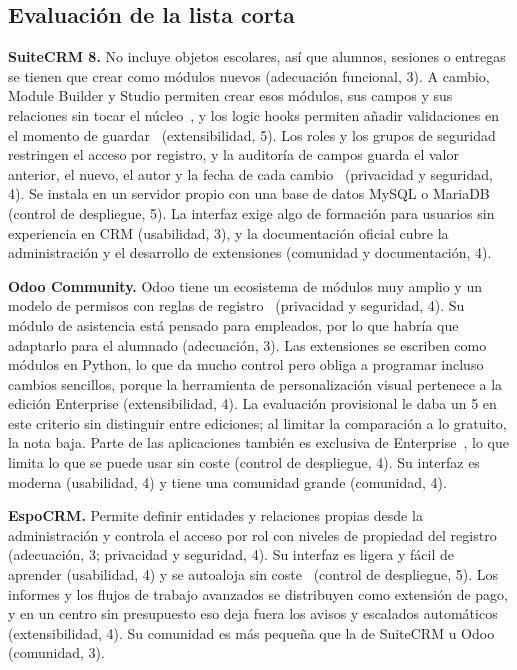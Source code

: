 \subsection{Evaluación de la lista corta}\label{sec:dis-evaluacion}

\textbf{SuiteCRM 8.} No incluye objetos escolares, así que alumnos, sesiones o entregas se tienen que crear como módulos nuevos (adecuación funcional, 3). A cambio, Module Builder y Studio permiten crear esos módulos, sus campos y sus relaciones sin tocar el núcleo~\cite{ref07}, y los logic hooks permiten añadir validaciones en el momento de guardar~\cite{ref50} (extensibilidad, 5). Los roles y los grupos de seguridad restringen el acceso por registro, y la auditoría de campos guarda el valor anterior, el nuevo, el autor y la fecha de cada cambio~\cite{ref08} (privacidad y seguridad, 4). Se instala en un servidor propio con una base de datos MySQL o MariaDB (control de despliegue, 5). La interfaz exige algo de formación para usuarios sin experiencia en CRM (usabilidad, 3), y la documentación oficial cubre la administración y el desarrollo de extensiones (comunidad y documentación, 4).

\textbf{Odoo Community.} Odoo tiene un ecosistema de módulos muy amplio y un modelo de permisos con reglas de registro~\cite{ref10} (privacidad y seguridad, 4). Su módulo de asistencia está pensado para empleados, por lo que habría que adaptarlo para el alumnado (adecuación, 3). Las extensiones se escriben como módulos en Python, lo que da mucho control pero obliga a programar incluso cambios sencillos, porque la herramienta de personalización visual pertenece a la edición Enterprise (extensibilidad, 4). La evaluación provisional le daba un 5 en este criterio sin distinguir entre ediciones; al limitar la comparación a lo gratuito, la nota baja. Parte de las aplicaciones también es exclusiva de Enterprise~\cite{ref48}, lo que limita lo que se puede usar sin coste (control de despliegue, 4). Su interfaz es moderna (usabilidad, 4) y tiene una comunidad grande (comunidad, 4).

\textbf{EspoCRM.} Permite definir entidades y relaciones propias desde la administración y controla el acceso por rol con niveles de propiedad del registro (adecuación, 3; privacidad y seguridad, 4). Su interfaz es ligera y fácil de aprender (usabilidad, 4) y se autoaloja sin coste~\cite{ref42} (control de despliegue, 5). Los informes y los flujos de trabajo avanzados se distribuyen como extensión de pago, y en un centro sin presupuesto eso deja fuera los avisos y escalados automáticos (extensibilidad, 4). Su comunidad es más pequeña que la de SuiteCRM u Odoo (comunidad, 3).

